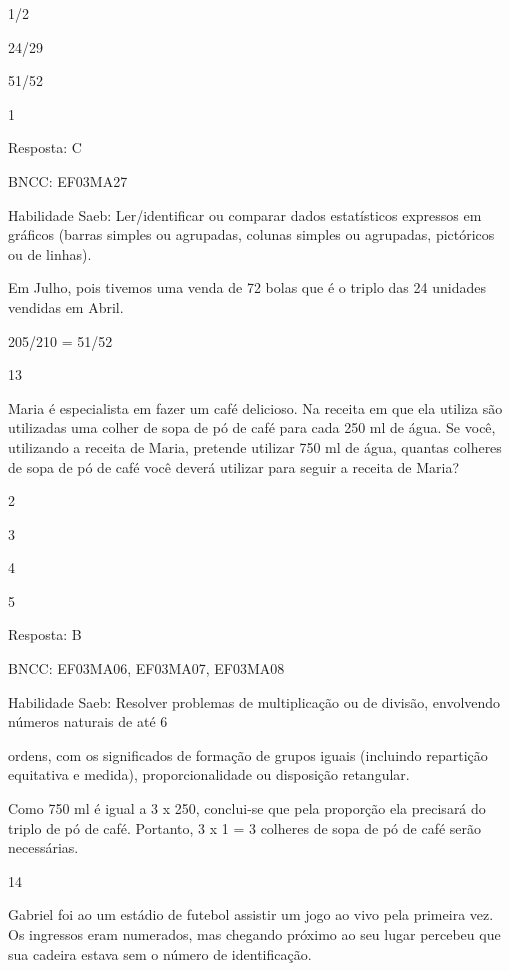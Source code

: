 \begin{escolha}
\begin{escolha}
\begin{escolha}
\item
  1/2
\item
  24/29
\item
  51/52
\item
  1
\end{escolha}

Resposta: C

BNCC: EF03MA27

Habilidade Saeb: Ler/identificar ou comparar dados estatísticos
expressos em gráficos (barras simples ou agrupadas, colunas simples ou
agrupadas, pictóricos ou de linhas).

Em Julho, pois tivemos uma venda de 72 bolas que é o triplo das 24
unidades vendidas em Abril.

205/210 = 51/52

\num{13}

Maria é especialista em fazer um café delicioso. Na receita em que ela
utiliza são utilizadas uma colher de sopa de pó de café para cada 250 ml
de água. Se você, utilizando a receita de Maria, pretende utilizar 750
ml de água, quantas colheres de sopa de pó de café você deverá utilizar
para seguir a receita de Maria?

\begin{escolha}
\item
  2
\item
  3
\item
  4
\item
  5
\end{escolha}

Resposta: B

BNCC: EF03MA06, EF03MA07, EF03MA08

Habilidade Saeb: Resolver problemas de multiplicação ou de divisão,
envolvendo números naturais de até 6

ordens, com os significados de formação de grupos iguais (incluindo
repartição equitativa e medida), proporcionalidade ou disposição
retangular.

Como 750 ml é igual a 3 x 250, conclui-se que pela proporção ela
precisará do triplo de pó de café. Portanto, 3 x 1 = 3 colheres de sopa
de pó de café serão necessárias.

\num{14}

Gabriel foi ao um estádio de futebol assistir um jogo ao vivo pela
primeira vez. Os ingressos eram numerados, mas chegando próximo ao seu
lugar percebeu que sua cadeira estava sem o número de identificação.


\end{escolha}
\end{escolha}
